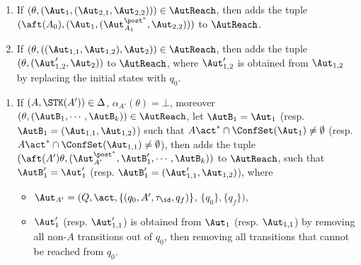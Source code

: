 {\begin{minipage}{0.95\textwidth}
\begin{enumerate}
\begin{itemize}
        \end{itemize}
    \item If $(\theta, (\Aut_1,(\Aut_{2,1},\Aut_{2,2}))) \in \AutReach$, then adds the tuple $(\aft(A_0), (\Aut_1,(\Aut_{A_1}^{\post^*},\Aut_{2,2})))$ to $\AutReach$.
    \item If $(\theta, ((\Aut_{1,1},\Aut_{1,2}),\Aut_2)) \in \AutReach$, then adds the tuple $(\theta, (\Aut_{1,2}',\Aut_2))$ to $\AutReach$, where $\Aut_{1,2}'$ is obtained from $\Aut_{1,2}$ by replacing the initial states with $q_0$.
\end{enumerate}
\end{minipage}
}
\smallskip

\smallskip
\fbox
{
\begin{minipage}{0.95\textwidth}
\begin{enumerate}
    \small
    \item If $(A,\STK(A')) \in\Delta$, $\alpha_{A'}(\theta) = \bot$, moreover $(\theta, (\AutB_1,\cdots,\AutB_k)) \in \AutReach$, let $\AutB_1=\Aut_1$ (resp. $\AutB_1=(\Aut_{1,1},\Aut_{1,2})$) such that $A\act^*\cap\ConfSet(\Aut_1)\neq \emptyset$ (resp. $A\act^*\cap\ConfSet(\Aut_{1,1})\neq\emptyset$), then adds the tuple $(\aft(A')\theta, (\Aut_{A'}^{\post^*},\AutB_1',\cdots,\AutB_k))$ to $\AutReach$, such that $\AutB_1' = \Aut_1'$ (resp. $\AutB_1'=(\Aut_{1,1}',\Aut_{1,2})$),
        where 
        \begin{itemize}
            \item $\Aut_{A'} = (Q, \act, \{(q_0, A', \tau_{\id}, q_f)\}$, $\{q_0\},\{q_f\})$,
            \item $\Aut_1'$ (resp. $\Aut_{1,1}'$) is obtained from $\Aut_1$ (resp. $\Aut_{1,1}$) by 
                removing all non-$A$ transitions out of $q_0$, then removing all transitions that cannot be reached from $q_0$.
        \end{itemize}

\end{enumerate}
\end{minipage}}
